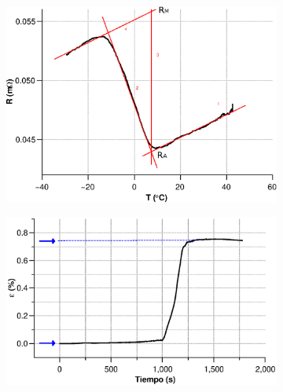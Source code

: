\documentclass[a4paper,12pt,fleqn,twoside,openany]{book}
\begin{document}
  \begin{figure}%
    \centering
    
    ~ %
    \begin{subfigure}{0.35\textwidth}
        \includegraphics[width=\textwidth]{Img/Resultados/Resistencia/ExpRes.eps}
        \caption{}
        \label{fig:ExpRes}
    \end{subfigure}
    \begin{subfigure}{0.47\textwidth}
        \includegraphics[width=\textwidth]{Img/Resultados/Resistencia/ExpStrain.eps}
        \caption{}
        \label{fig:ExpStrain}
    \end{subfigure}

\end{figure}
\end{document}
